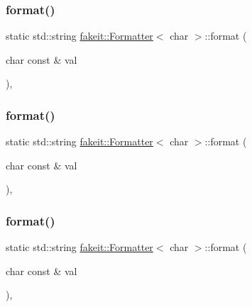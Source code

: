 \subsubsection{\texorpdfstring{format()}{format()}\hspace{0.1cm}{\footnotesize\ttfamily [1/9]}}
{\footnotesize\ttfamily static std\+::string \mbox{\hyperlink{structfakeit_1_1Formatter}{fakeit\+::\+Formatter}}$<$ char $>$\+::format (\begin{DoxyParamCaption}\item[{char const \&}]{val }\end{DoxyParamCaption})\hspace{0.3cm}{\ttfamily [inline]}, {\ttfamily [static]}}

\mbox{\label{structfakeit_1_1Formatter_3_01char_01_4_af27afa068787a34b29ea545907c3daaf}} 
\subsubsection{\texorpdfstring{format()}{format()}\hspace{0.1cm}{\footnotesize\ttfamily [2/9]}}
{\footnotesize\ttfamily static std\+::string \mbox{\hyperlink{structfakeit_1_1Formatter}{fakeit\+::\+Formatter}}$<$ char $>$\+::format (\begin{DoxyParamCaption}\item[{char const \&}]{val }\end{DoxyParamCaption})\hspace{0.3cm}{\ttfamily [inline]}, {\ttfamily [static]}}

\mbox{\label{structfakeit_1_1Formatter_3_01char_01_4_af27afa068787a34b29ea545907c3daaf}} 
\subsubsection{\texorpdfstring{format()}{format()}\hspace{0.1cm}{\footnotesize\ttfamily [3/9]}}
{\footnotesize\ttfamily static std\+::string \mbox{\hyperlink{structfakeit_1_1Formatter}{fakeit\+::\+Formatter}}$<$ char $>$\+::format (\begin{DoxyParamCaption}\item[{char const \&}]{val }\end{DoxyParamCaption})\hspace{0.3cm}{\ttfamily [inline]}, {\ttfamily [static]}}

